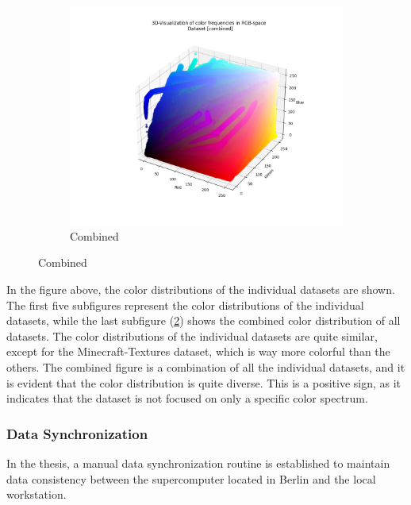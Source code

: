 \begin{figure}[h]
\begin{subfigure}{.33\textwidth}
        \end{subfigure}%
        \hfill
        \begin{subfigure}{.33\textwidth}
            \centering
            \includegraphics[width=\linewidth]{../code/dataAnalysis/output/combined.png}
            \caption{Combined}
            \label{fig:dataset-Combined}
        \end{subfigure}%
        \hfill
    \end{figure}

    In the figure above, the color distributions of the individual datasets are shown. The first five subfigures represent the color distributions of the individual datasets, while the last subfigure (\ref{fig:dataset-Combined}) shows the combined color distribution of all datasets. The color distributions of the individual datasets are quite similar, except for the Minecraft-Textures dataset, which is way more colorful than the others. The combined figure is a combination of all the individual datasets, and it is evident that the color distribution is quite diverse. This is a positive sign, as it indicates that the dataset is not focused on only a specific color spectrum.

    \subsubsection{Data Synchronization}

    In the thesis, a manual data synchronization routine is established to maintain data consistency between the supercomputer located in Berlin and the local workstation.

